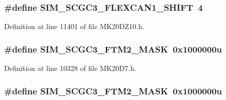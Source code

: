 \subsubsection[{\texorpdfstring{S\+I\+M\+\_\+\+S\+C\+G\+C3\+\_\+\+F\+L\+E\+X\+C\+A\+N1\+\_\+\+S\+H\+I\+FT}{SIM_SCGC3_FLEXCAN1_SHIFT}}]{\setlength{\rightskip}{0pt plus 5cm}\#define S\+I\+M\+\_\+\+S\+C\+G\+C3\+\_\+\+F\+L\+E\+X\+C\+A\+N1\+\_\+\+S\+H\+I\+FT~4}\hypertarget{group___s_i_m___register___masks_ga26dc7ff908234ceb8daca5451e281399}{}\label{group___s_i_m___register___masks_ga26dc7ff908234ceb8daca5451e281399}


Definition at line 11401 of file M\+K20\+D\+Z10.\+h.

\subsubsection[{\texorpdfstring{S\+I\+M\+\_\+\+S\+C\+G\+C3\+\_\+\+F\+T\+M2\+\_\+\+M\+A\+SK}{SIM_SCGC3_FTM2_MASK}}]{\setlength{\rightskip}{0pt plus 5cm}\#define S\+I\+M\+\_\+\+S\+C\+G\+C3\+\_\+\+F\+T\+M2\+\_\+\+M\+A\+SK~0x1000000u}\hypertarget{group___s_i_m___register___masks_gafe5009515ab0955d724fa5306171aeeb}{}\label{group___s_i_m___register___masks_gafe5009515ab0955d724fa5306171aeeb}


Definition at line 10328 of file M\+K20\+D7.\+h.

\subsubsection[{\texorpdfstring{S\+I\+M\+\_\+\+S\+C\+G\+C3\+\_\+\+F\+T\+M2\+\_\+\+M\+A\+SK}{SIM_SCGC3_FTM2_MASK}}]{\setlength{\rightskip}{0pt plus 5cm}\#define S\+I\+M\+\_\+\+S\+C\+G\+C3\+\_\+\+F\+T\+M2\+\_\+\+M\+A\+SK~0x1000000u}\hypertarget{group___s_i_m___register___masks_gafe5009515ab0955d724fa5306171aeeb}{}\label{group___s_i_m___register___masks_gafe5009515ab0955d724fa5306171aeeb}


